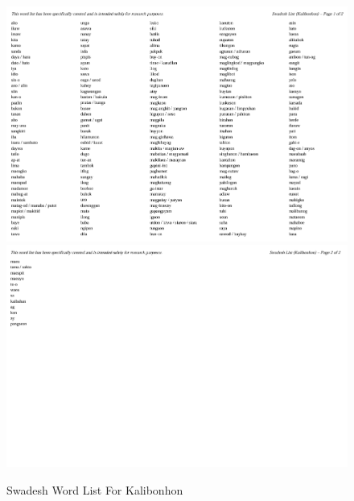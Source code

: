 \begin{figure}[h!]
	\centering
	\includegraphics[width=\textwidth]{./appendix/swadesh_kalibo1.png}
	\includegraphics[width=\textwidth]{./appendix/swadesh_kalibo2.png}
	\caption{Swadesh Word List For Kalibonhon}
	\label{fig:swadeshKalibo}
\end{figure}

